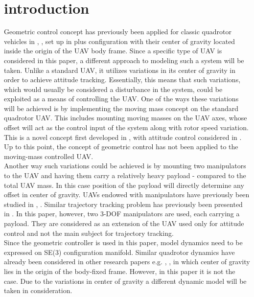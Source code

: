 \section{introduction}

Geometric control concept has previously been applied for classic quadrotor vehicles in \cite{LeeClanak4}, \cite{LeeClanak3}, \cite{LeeClanak1} set up in plus configuration with their center of gravity located inside the origin of the UAV body frame. Since a specific type of UAV is considered in this paper, a different approach to modeling such a system will be taken. Unlike a standard UAV, it utilizes variations in its center of gravity in order to achieve attitude tracking. Essentially, this means that such variations, which would usually be considered a disturbance in the system, could be exploited as a means of controlling the UAV. 
One of the ways these variations will be achieved is by implementing the moving mass concept on the standard quadrotor UAV. This includes mounting moving masses on the UAV axes, whose offset will act as the control input of the system along with rotor speed variation. This is a novel concept first developed in \cite{movingMass1},\cite{movingMass2} with attitude control considered in \cite{movingMass3}. Up to this point, the concept of geometric control has not been applied to the moving-mass controlled UAV.  \\
Another way such variations could be achieved is by mounting two manipulators to the UAV and having them carry a relatively heavy payload - compared to the total UAV mass. In this case position of the payload will directly determine any offset in center of gravity. UAVs endowed with manipulators have previously been studied in \cite{manipulator1}, \cite{manipulator2}. Similar trajectory tracking problem has previously been presented in \cite{manipulator3}. In this paper, however, two 3-DOF manipulators are used, each carrying a payload. They are considered as an extension of the UAV used only for attitude control and not the main subject for trajectory tracking. \\
Since the geometric controller is used in this paper, model dynamics need to be expressed on SE(3) configuration manifold. Similar quadrotor dynamics have already been considered in other research papers e.g. \cite{LeeClanak4}, \cite{LeeClanak2}, \cite{LeeClanak1} in which center of gravity lies in the origin of the body-fixed frame. However, in this paper it is not the case. Due to the variations in center of gravity a different dynamic model will be taken in consideration. \\
